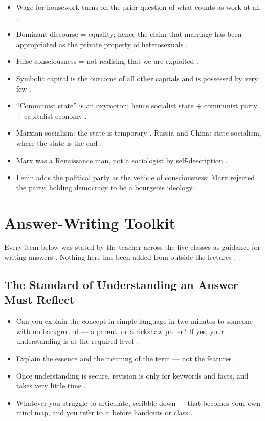 \begin{QuickRevision}
\begin{itemize}
    \item Wage for housework turns on the prior question of what counts as work at all .
    \item Dominant discourse = equality; hence the claim that marriage has been appropriated as the private property of heterosexuals .
    \item False consciousness = not realising that we are exploited .
    \item Symbolic capital is the outcome of all other capitals and is possessed by very few .
    \item ``Communist state'' is an oxymoron; hence socialist state + communist party + capitalist economy .
    \item Marxian socialism: the state is temporary . Russia and China: state socialism, where the state is the end .
    \item Marx was a Renaissance man, not a sociologist by self-description .
    \item Lenin adds the political party as the vehicle of consciousness; Marx rejected the party, holding democracy to be a bourgeois ideology .
\end{itemize}
\end{QuickRevision}

\sectiondivider

\section{Answer-Writing Toolkit}
Every item below was stated by the teacher across the five classes as guidance for writing answers . Nothing here has been added from outside the lectures .

\subsection{The Standard of Understanding an Answer Must Reflect}
\begin{itemize}
    \item Can you explain the concept in simple language in two minutes to someone with no background --- a parent, or a rickshaw puller? If yes, your understanding is at the required level .
    \item Explain the essence and the meaning of the term --- not the features .
    \item Once understanding is secure, revision is only for keywords and facts, and takes very little time .
    \item Whatever you struggle to articulate, scribble down --- that becomes your own mind map, and you refer to it before handouts or class .
\end{itemize}

